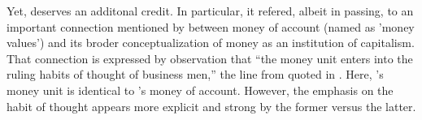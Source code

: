 

Yet, \cite{dillard1987} deserves an additonal credit. In particular, it refered, albeit in passing, to an important connection mentioned by \citeauthor{veblen1904} between money of account (named as 'money values') and its broder conceptualization of money as an institution of capitalism. That connection is expressed by observation that ``the money unit enters into the ruling habits of thought of business men,'' the line from \citep[p.~83]{veblen1904} quoted in \citep[p.~1628]{dillard1987}. Here, \citeauthor{veblen1904}'s money unit is identical to \citeauthor{keynes1930a}'s money of account. However, the emphasis on the habit of thought appears more explicit and strong by the former versus the latter.    

